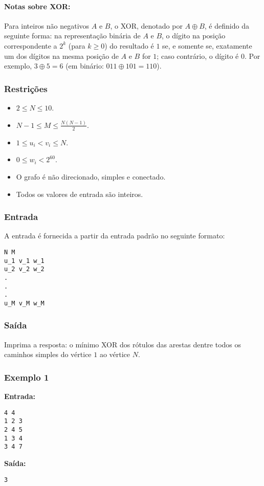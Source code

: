 \paragraph{Notas sobre XOR:}
Para inteiros não negativos \(A\) e \(B\), o XOR, denotado por \(A \oplus B\), é definido da seguinte forma: na representação binária de \(A\) e \(B\), o dígito na posição correspondente a \(2^k\) (para \(k \ge 0\)) do resultado é \(1\) se, e somente se, exatamente um dos dígitos na mesma posição de \(A\) e \(B\) for \(1\); caso contrário, o dígito é \(0\). Por exemplo, \(3 \oplus 5 = 6\) (em binário: \(011 \oplus 101 = 110\)).

\subsubsection*{Restrições}
\begin{itemize}
    \item \(2 \leq N \leq 10\).
    \item \(N-1 \leq M \leq \frac{N(N-1)}{2}\).
    \item \(1 \leq u_i < v_i \leq N\).
    \item \(0 \leq w_i < 2^{60}\).
    \item O grafo é não direcionado, simples e conectado.
    \item Todos os valores de entrada são inteiros.
\end{itemize}

\subsubsection*{Entrada}
A entrada é fornecida a partir da entrada padrão no seguinte formato:
\begin{verbatim}
N M
u_1 v_1 w_1
u_2 v_2 w_2
.
.
.
u_M v_M w_M
\end{verbatim}

\subsubsection*{Saída}
Imprima a resposta: o mínimo XOR dos rótulos das arestas dentre todos os caminhos simples do vértice \(1\) ao vértice \(N\).

\subsubsection*{Exemplo 1}
\textbf{Entrada:}
\begin{verbatim}
4 4
1 2 3
2 4 5
1 3 4
3 4 7
\end{verbatim}
\textbf{Saída:}
\begin{verbatim}
3
\end{verbatim}

